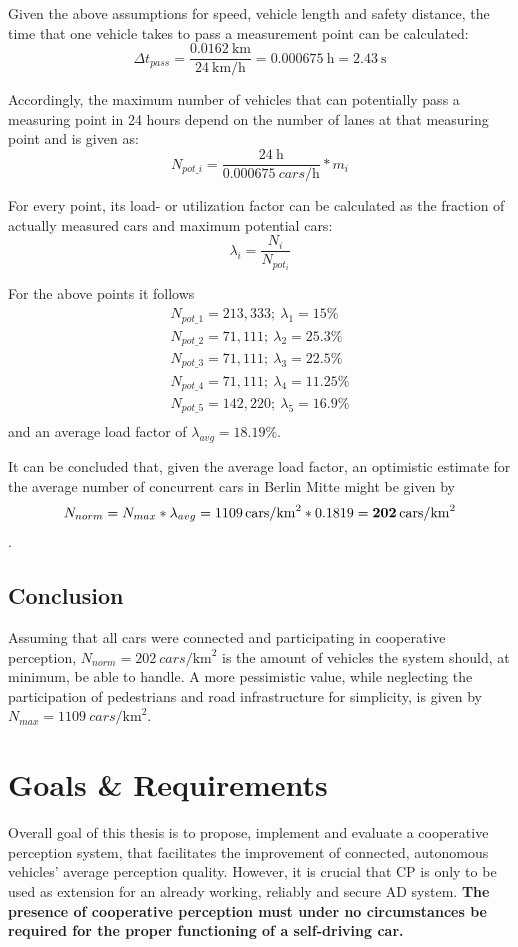 Given the above assumptions for speed, vehicle length and safety distance, the time that one vehicle takes to pass a measurement point can be calculated: $$\Delta t_{pass} = \frac{\SI{0.0162}{\km}}{\SI{24}{\km\per\hour}} = \SI{0.000675}{\hour} = \SI{2.43}{\second}$$

Accordingly, the maximum number of vehicles that can potentially pass a measuring point in 24 hours depend on the number of lanes at that measuring point and is given as: $$N_{pot\_i} = \frac{\SI{24}{\hour}}{\SI{0.000675}{cars\per\hour}} * m_i$$

For every point, its load- or utilization factor can be calculated as the fraction of actually measured cars and maximum potential cars: $$\lambda_i = \frac{N_i}{N_{pot_i}}$$

For the above points it follows
\begin{gather*}
N_{pot\_1} = 213,333; \  \lambda_1 = 15 \% \\
N_{pot\_2} = 71,111; \  \lambda_2 = 25.3 \% \\
N_{pot\_3} = 71,111; \  \lambda_3 = 22.5 \% \\
N_{pot\_4} = 71,111; \  \lambda_4 = 11.25 \% \\
N_{pot\_5} = 142,220; \  \lambda_5 = 16.9 \% \\
\end{gather*}
and an average load factor of $\lambda_{avg} = 18.19 \%$.

It can be concluded that, given the average load factor, an optimistic estimate for the average number of concurrent cars in Berlin Mitte might be given by $$N_{norm} = N_{max} * \lambda_{avg} = \SI[detect-weight]{1109}{cars\per\square\km} * 0.1819 = \textbf{\SI[detect-weight]{202}{cars\per\square\km}}$$.

\subsection{Conclusion}
\label{subsec:problem_analysis:conclusion}
Assuming that all cars were connected and participating in cooperative perception, \textbf{$N_{norm} = \SI[detect-weight]{202}{cars\per\square\km}$} is the amount of vehicles the system should, at minimum, be able to handle. A more pessimistic value, while neglecting the participation of pedestrians and road infrastructure for simplicity, is given by \textbf{$N_{max} = \SI[detect-weight]{1109}{cars\per\square\km}$}.

\section{Goals \& Requirements}
\label{sec:problem_analysis:goals_requirements}
Overall goal of this thesis is to propose, implement and evaluate a cooperative perception system, that facilitates the improvement of connected, autonomous vehicles' average perception quality. However, it is crucial that CP is only to be used as extension for an already working, reliably and secure AD system. \textbf{The presence of cooperative perception must under no circumstances be required for the proper functioning of a self-driving car.}

